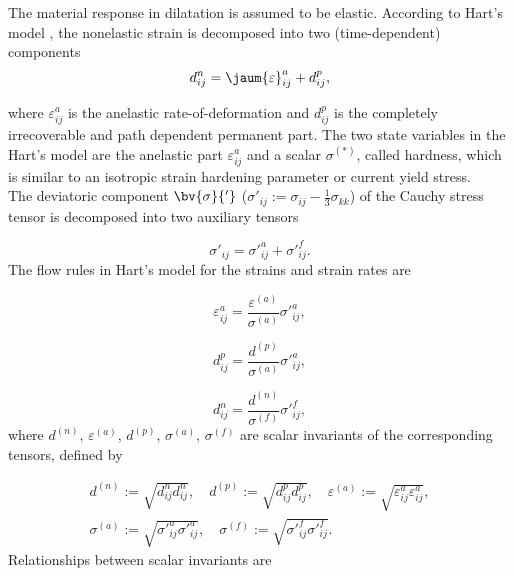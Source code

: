 The material response in dilatation is assumed to be elastic. According to Hart's model \cite{Ha76,Ha82,MuChaDBE3,Mu82}, the nonelastic strain is decomposed into two (time-dependent) components
\begin{equation}\label{eq:NonElasticStrainDecomposition}
d^{n}_{ij}=\jaum{\varepsilon}^{a}_{ij}+d^{p}_{ij},
\end{equation}

where $\varepsilon^{a}_{ij}$ is the anelastic rate-of-deformation 
and $d^{p}_{ij}$ is the completely irrecoverable and path dependent permanent part. The two state variables in the Hart's model are the anelastic part  $\varepsilon^{a}_{ij}$ and a scalar $\sigma^{(*)}$, called hardness, which is similar to an isotropic strain hardening parameter or current yield stress.\\
The deviatoric component $\bv{\sigma}{'}$ ($\sigma{'}_{ij}:=\sigma_{ij}-\frac{1}{3}\sigma_{kk}$) of the Cauchy stress tensor is decomposed into two auxiliary tensors


\begin{equation}\label{eq:StressDeviatorDeomposition}
\sigma{'}_{ij}=\sigma{'}^{a}_{ij}+\sigma{'}^{f}_{ij}.
\end{equation}
The flow rules in Hart's model for the strains and  strain rates are  \cite{MuChaDBE3,Mu82}


\begin{equation}\label{eq:AnelasticStrain}
\varepsilon^{a}_{ij}=\frac{\varepsilon^{(a)}}{\sigma^{(a)}}\sigma{'}^{a}_{ij},
\end{equation}

\begin{equation}\label{eq:PlasticStrainRate}
d^{p}_{ij}=\frac{d^{(p)}}{\sigma^{(a)}}\sigma{'}^{a}_{ij},
\end{equation}

\begin{equation}\label{eq:NonElasticStrainRate}
d^{n}_{ij}=\frac{d^{(n)}}{\sigma^{(f)}}\sigma{'}^{f}_{ij},
\end{equation}
where $d^{(n)}$, $\varepsilon^{(a)}$, $d^{(p)}$,  $\sigma^{(a)}$,  $\sigma^{(f)}$ are scalar invariants of the corresponding tensors, defined by 

\begin{equation}\label{eq:ScalarInvariants}
\begin{array}{c}
d^{(n)}:=\sqrt{d^{n}_{ij}d^{n}_{ij}},\quad  d^{(p)}:=\sqrt{d^{p}_{ij}d^{p}_{ij}}, \quad \varepsilon^{(a)}:=\sqrt{\varepsilon^{a}_{ij}\varepsilon^{a}_{ij}}, \\[4ex]
\sigma^{(a)}:=\sqrt{\sigma{'}^{a}_{ij} \sigma{'}^{a}_{ij}},\quad  \sigma^{(f)}:=\sqrt{\sigma{'}^{f}_{ij} \sigma{'}^{f}_{ij}}.
\end{array}
\end{equation}
Relationships between scalar invariants are

